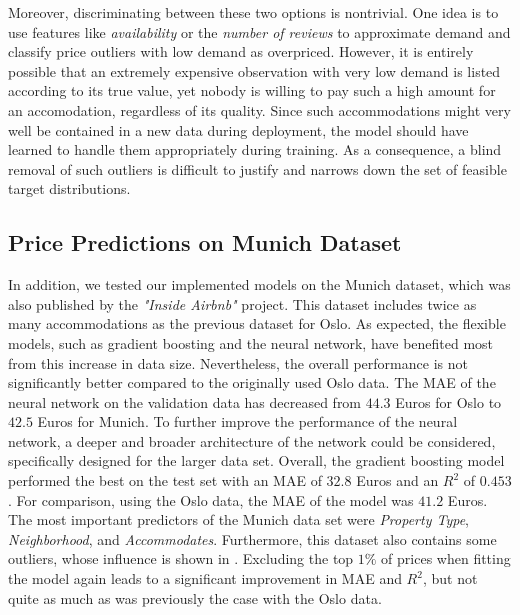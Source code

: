 Moreover, discriminating between these two options is nontrivial.
One idea is to use features like \emph{availability} or the \emph{number of reviews} to approximate demand and classify price outliers with low demand as overpriced.
However, it is entirely possible that an extremely expensive observation with very low demand is listed according to its true value, yet nobody is willing to pay such a high amount for an accomodation, regardless of its quality.
Since such accommodations might very well be contained in a new data during deployment, the model should have learned to handle them appropriately during training.
As a consequence, a blind removal of such outliers is difficult to justify and narrows down the set of feasible target distributions.


\subsection{Price Predictions on Munich Dataset}

In addition, we tested our implemented models on the Munich dataset, which was also published by the \emph{"Inside Airbnb"} project.
This dataset includes twice as many accommodations as the previous dataset for Oslo. As expected, the flexible models, such as gradient boosting and the neural network, have benefited most from this increase in data size. Nevertheless, the overall performance is not significantly better compared to the originally used Oslo data.
The MAE of the neural network on the validation data has decreased from $44.3$ Euros for Oslo to $42.5$ Euros for Munich. To further improve the performance of the neural network, a deeper and broader architecture of the network could be considered, specifically designed for the larger data set.
Overall, the gradient boosting model performed the best on the test set with an MAE of $32.8$ Euros and an $R^2$ of $0.453$. For comparison, using the Oslo data, the MAE of the model was $41.2$ Euros.
The most important predictors of the Munich data set were \emph{Property Type}, \emph{Neighborhood}, and \emph{Accommodates}. Furthermore, this dataset also contains some outliers, whose influence is shown in . Excluding the top $1\%$ of prices when fitting the model again leads to a significant improvement in MAE and $R^2$, but not quite as much as was previously the case with the Oslo data.

